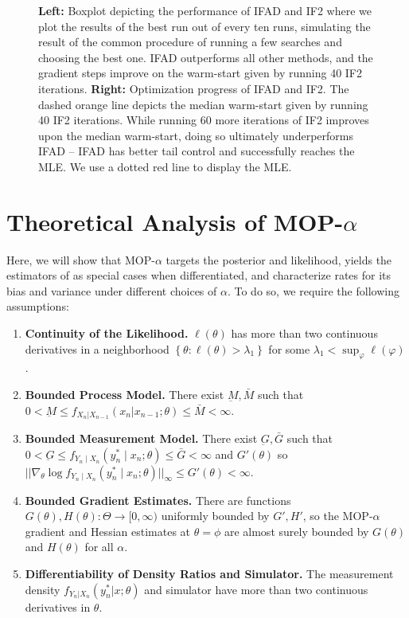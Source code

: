 \documentclass[9pt,twocolumn,twoside]{pnas-new}
\begin{document}
\begin{figure}[ht]
    \caption{\textbf{Left:} Boxplot depicting the performance of IFAD and IF2 where we plot the results of the best run out of every ten runs, simulating the result of the common procedure of running a few searches and choosing the best one. IFAD outperforms all other methods, and the gradient steps improve on the warm-start given by running 40 IF2 iterations. 
    \textbf{Right:} Optimization progress of IFAD and IF2. The dashed orange line depicts the median warm-start given by running 40 IF2 iterations. While running 60 more iterations of IF2 improves upon the median warm-start, doing so ultimately underperforms IFAD -- IFAD has better tail control and successfully reaches the MLE. 
    We use a dotted red line to display the MLE.}
    \label{fig:boxplot-search}
\end{figure}


\section{Theoretical Analysis of MOP-$\alpha$}
\label{sec:thms}

Here, we will show that MOP-$\alpha$ targets the posterior and likelihood, yields the estimators of \cite{poyiadjis11, scibior21, naesseth18} as special cases when differentiated, and characterize rates for its bias and variance under different choices of $\alpha$. To do so, we require the following assumptions:

\begin{enumerate}[label=(A\arabic*),itemsep=-1.2ex] 
    \item \textbf{Continuity of the Likelihood.} $\ell(\theta)$ has more than two continuous derivatives in a neighborhood $\left\{\theta: \ell(\theta)>\lambda_1\right\}$ for some $\lambda_1<\sup _{\varphi} \ell(\varphi)$. \label{assump:conti-lik}
    \item \textbf{Bounded Process Model.} There exist $\underbar{M}, \bar{M}$ such that $0 < \underbar{M} \leq f_{X_n|X_{n-1}}(x_n | x_{n-1};\theta) \leq \bar{M} < \infty$. \label{assump:bounded-process}
    \item \textbf{Bounded Measurement Model.} There exist $\underbar{G}, \bar{G}$ such that $0<\underbar{G} \leq f_{Y_n \mid X_n}\left(y_n^* \mid x_n; \theta\right) \leq \bar{G}<\infty$ and $G'(\theta)$ so $||\nabla_\theta \log f_{Y_n \mid X_n}\left(y_n^* \mid x_n; \theta\right)||_\infty \leq G'(\theta)< \infty$. \label{assump:bounded-measurement}
    \item \textbf{Bounded Gradient Estimates.} There are functions $G(\theta), H(\theta): \Theta \to [0,\infty)$ uniformly bounded by $G', H'$, so the MOP-$\alpha$ gradient and Hessian estimates at $\theta=\phi$ are almost surely bounded by $G(\theta)$ and $H(\theta)$ for all $\alpha$. \label{assump:local-bounded-derivative}
    \item \textbf{Differentiability of Density Ratios and Simulator.} The measurement density $f_{Y_n|X_n}(y_n^*|x; \theta)$ and simulator have more than two continuous derivatives in $\theta$. \label{assump:diff-meas-and-sim}
\end{enumerate}
\end{document}

